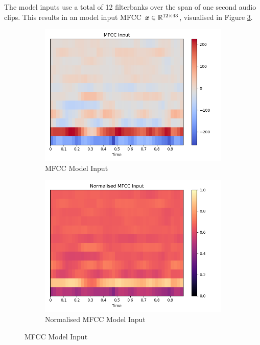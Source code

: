 The model inputs use a total of 12 filterbanks over the span of one second audio clips.
This results in an model input MFCC ${\boldsymbol{{x}}} \in \mathbb{R}^{12 \times 43}$, visualised in Figure \ref{fig:mfcc_model_input}.

\begin{figure}[h!]
    \centering
    \begin{subfigure}[b]{0.49\textwidth}
        \includegraphics[width=\textwidth]{figures/mfcc/mfcc_input.png}
        \caption{MFCC Model Input}\label{fig:mfcc_input}
    \end{subfigure}
    \begin{subfigure}[b]{0.49\textwidth}
        \includegraphics[width=\textwidth]{figures/mfcc/norm_mfcc_input.png}
        \caption{Normalised MFCC Model Input}\label{fig:mfcc_norm_input}
    \end{subfigure}
    \caption{MFCC Model Input}\label{fig:mfcc_model_input}
\end{figure}

